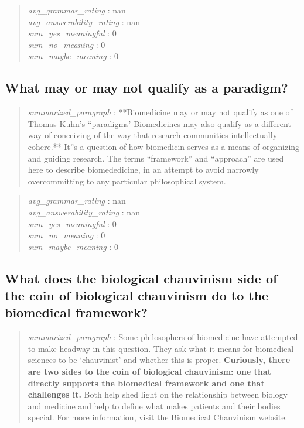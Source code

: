 \begin{quote}
\emph{avg\_grammar\_rating} : nan\\
\emph{avg\_answerability\_rating} : nan\\
\emph{sum\_yes\_meaningful} : 0\\
\emph{sum\_no\_meaning} : 0\\
\emph{sum\_maybe\_meaning} : 0
\end{quote}

\hypertarget{what-may-or-may-not-qualify-as-a-paradigm}{%
\subsection{What may or may not qualify as a
paradigm?}\label{what-may-or-may-not-qualify-as-a-paradigm}}

\begin{quote}
\emph{summarized\_paragraph} : **Biomedicine may or may not qualify as
one of Thomas Kuhn's ``paradigms' Biomedicines may also qualify as a
different way of conceiving of the way that research communities
intellectually cohere.** It''s a question of how biomedicin serves as a
means of organizing and guiding research. The terms ``framework'' and
``approach'' are used here to describe biomededicine, in an attempt to
avoid narrowly overcommitting to any particular philosophical system.
\end{quote}

\begin{quote}
\emph{avg\_grammar\_rating} : nan\\
\emph{avg\_answerability\_rating} : nan\\
\emph{sum\_yes\_meaningful} : 0\\
\emph{sum\_no\_meaning} : 0\\
\emph{sum\_maybe\_meaning} : 0
\end{quote}

\hypertarget{what-does-the-biological-chauvinism-side-of-the-coin-of-biological-chauvinism-do-to-the-biomedical-framework}{%
\subsection{What does the biological chauvinism side of the coin of
biological chauvinism do to the biomedical
framework?}\label{what-does-the-biological-chauvinism-side-of-the-coin-of-biological-chauvinism-do-to-the-biomedical-framework}}

\begin{quote}
\emph{summarized\_paragraph} : Some philosophers of biomedicine have
attempted to make headway in this question. They ask what it means for
biomedical sciences to be `chauvinist' and whether this is proper.
\textbf{Curiously, there are two sides to the coin of biological
chauvinism: one that directly supports the biomedical framework and one
that challenges it.} Both help shed light on the relationship between
biology and medicine and help to define what makes patients and their
bodies special. For more information, visit the Biomedical Chauvinism
website.
\end{quote}

